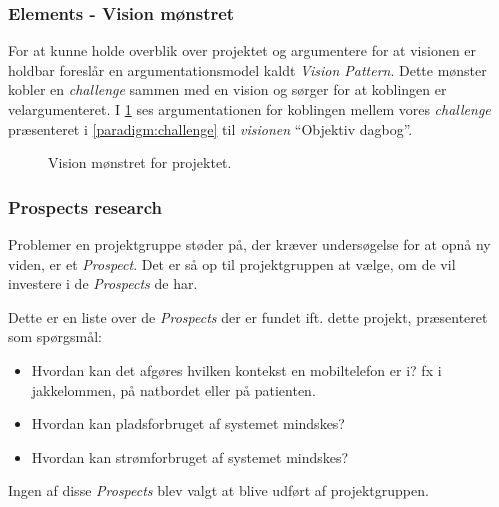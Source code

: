 \subsubsection{Elements - Vision mønstret}
For at kunne holde overblik over projektet og argumentere for at visionen er holdbar foreslår \citet[Kapitel 15 - Project]{art:essence} en argumentationsmodel kaldt \emph{Vision Pattern}. 
Dette mønster kobler en \emph{challenge} sammen med en vision og sørger for at koblingen er velargumenteret.
I \cref{fig:visionpattern} ses argumentationen for koblingen mellem vores \textit{challenge} præsenteret i \cref{paradigm:challenge} til \textit{visionen} ``Objektiv dagbog''.

\begin{figure}[h]
	\centering
	\resizebox{\columnwidth}{!}{
		}
	\caption{Vision mønstret for projektet.}
	\label{fig:visionpattern}
\end{figure}

\subsubsection{Prospects research}
Problemer en projektgruppe støder på, der kræver undersøgelse for at opnå ny viden, er et \textit{Prospect}.
Det er så op til projektgruppen at vælge, om de vil investere i de \textit{Prospects} de har. \cite[nederst på side 104]{art:essence}

Dette er en liste over de \textit{Prospects} der er fundet ift. dette projekt, præsenteret som spørgsmål:
\begin{itemize}
	\item Hvordan kan det afgøres hvilken kontekst en mobiltelefon er i? fx i jakkelommen, på natbordet eller på patienten.
	\item Hvordan kan pladsforbruget af systemet mindskes?
	\item Hvordan kan strømforbruget af systemet mindskes?
\end{itemize}
Ingen af disse \textit{Prospects} blev valgt at blive udført af projektgruppen.